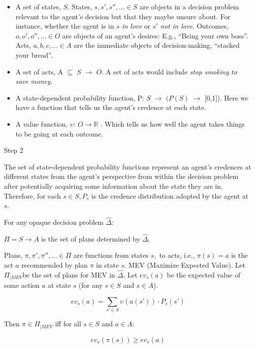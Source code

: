 \documentclass[
  letterpaper,
  DIV=11,
  numbers=noendperiod]{scrartcl}
\providecommand{\tightlist}{%
  \setlength{\itemsep}{0pt}\setlength{\parskip}{0pt}}
\begin{document}
\begin{itemize}
\tightlist
\item
  A set of states, \(S\). States, \(s, s', s'', . . . \in S\) are
  objects in a decision problem relevant to the agent's decision but
  that they maybe unsure about. For instance, whether the agent is in
  \(s\) \emph{in love} or \(s'\) \emph{not in love}. Outcomes,
  \(o, o', o'', . . . \in O\) are objects of an agent's desires: E.g.,
  ``Being your own boss''. Acts, \(a, b, c, . . . \in A\) are the
  immediate objects of decision-making, ``stacked your bread''.
\item
  A set of acts, A \(\subseteq\) \(S\) \(\rightarrow\) \(O\). A set of
  acts would include \emph{stop smoking to save money}.
\item
  A state-dependent probability function, P: \(S\) \(\rightarrow\)
  \((P(S)\) \(\rightarrow\) {[}0,1{]}). Here we have a function that
  tells us the agent's credence at each state.
\item
  A value function, \(\upsilon\): \(O \rightarrow \mathbb{R}\) . Which
  tells us how well the agent takes things to be going at each outcome.
\end{itemize}

Step 2

The set of state-dependent probability functions represent an agent's
credences at different states from the agent's perspective from within
the decision problem after potentially acquiring some information about
the state they are in. Therefore, for each \(s \in S, P_{s}\) is the
credence distribution adopted by the agent at \(s\).

For any opaque decision problem \(\hat{\Delta}\):

\(\Pi = S \rightarrow A\) is the set of plans determined by
\(\hat{\Delta}\).

Plans, \(\pi, \pi', \pi'', . . . \in \Pi\) are functions from states
\(s,\) to acts, i.e., \(\pi(s) = a\) is the act \(a\) recommended by
plan \(\pi\) in state \(s\). MEV (Maximize Expected Value). Let
\(\Pi_{|MEV}\)be the set of plans for MEV in \(\hat{\Delta}\). Let
\(ev_{s}(a)\) be the expected value of some action \(a\) at state \(s\)
(for any \(s \in S\) and \(s \in A\)).

\[ev_{s}(a) = \sum\limits_{s’ \in S} \upsilon(a(s’)) \cdot P_{s}(s’)\]

Then \(\pi \in \Pi_{|MEV}\) iff for all \(s \in S\) and \(a \in A\):

\[ev_{s}(\pi(s)) \geq ev_{s}(a)\]
\end{document}

